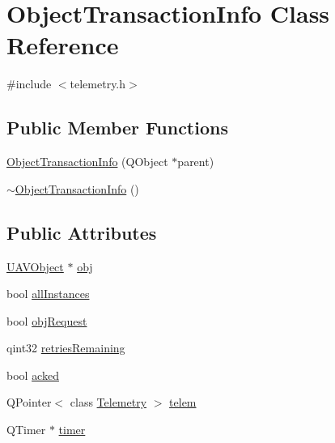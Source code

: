 \hypertarget{class_object_transaction_info}{\section{\-Object\-Transaction\-Info \-Class \-Reference}
\label{class_object_transaction_info}
}


{\ttfamily \#include $<$telemetry.\-h$>$}

\subsection*{\-Public \-Member \-Functions}
\begin{DoxyCompactItemize}
\item 
\hyperlink{group___u_a_v_talk_plugin_ga56a113c31769c8841a65cf085c53a33e}{\-Object\-Transaction\-Info} (\-Q\-Object $\ast$parent)
\item 
\hyperlink{group___u_a_v_talk_plugin_ga8b1a7a6e63feac107ca370ce1a68758f}{$\sim$\-Object\-Transaction\-Info} ()
\end{DoxyCompactItemize}
\subsection*{\-Public \-Attributes}
\begin{DoxyCompactItemize}
\item 
\hyperlink{class_u_a_v_object}{\-U\-A\-V\-Object} $\ast$ \hyperlink{group___u_a_v_talk_plugin_ga9ad43239e470da9249f214e43521bddb}{obj}
\item 
bool \hyperlink{group___u_a_v_talk_plugin_gaf134962f4df09323cf89245e3bc32f6e}{all\-Instances}
\item 
bool \hyperlink{group___u_a_v_talk_plugin_ga35e10d2ea8bcd4f4bd1e32db43857e2c}{obj\-Request}
\item 
qint32 \hyperlink{group___u_a_v_talk_plugin_gaf7cfad07635a777272c96c4b2fb2284b}{retries\-Remaining}
\item 
bool \hyperlink{group___u_a_v_talk_plugin_ga27c9898b3e1a5940f0340891578f6ea5}{acked}
\item 
\-Q\-Pointer$<$ class \hyperlink{class_telemetry}{\-Telemetry} $>$ \hyperlink{group___u_a_v_talk_plugin_ga1df77178093618626fe21d5bc58b03f4}{telem}
\item 
\-Q\-Timer $\ast$ \hyperlink{group___u_a_v_talk_plugin_gaf400de9c7d9b37a52e821b1a7bc6580e}{timer}
\end{DoxyCompactItemize}


